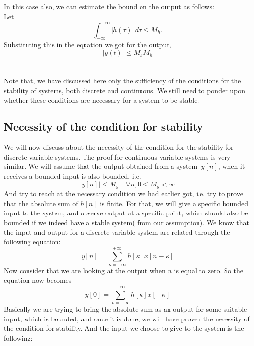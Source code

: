 In this case also, we can estimate the bound on the output as follows:\\
Let
\begin{equation}
\int_{-\infty}^{+\infty}| h(\tau)|\,d\tau \le M_{h}. \nonumber
\end{equation}
Substituting this in the equation we got for the output,
\begin{equation}
|y(t)|\le M_{x}M_{h} \nonumber
\end{equation}\\\\
Note that, we have discussed here only the sufficiency of the conditions for the stability of systems, both discrete and continuous. We still need to ponder upon whether these conditions are necessary for a system to be stable.


\subsection{Necessity of the condition for stability}
We will now discuss about the necessity of the condition for the stability for discrete variable systems. The proof for continuous variable systems is very similar. We will assume that the output obtained from a system, $y[n]$, when it receives a bounded input is also bounded, i.e.
\begin{equation}
|y[n]| \le M_{y} \quad \forall n, 0 \le M_{y}< \infty \nonumber
\end{equation}
And try to reach at the necessary condition we had earlier got, i.e. try to prove that the absolute sum of $h[n]$ is finite. For that, we will give a specific bounded input to the system, and observe output at a specific point, which should also be bounded if we indeed have a stable system( from our assumption). We know that the input and output for a discrete variable system are related through the following equation:
\begin{equation}
y[n]=\sum_{\kappa=-\infty}^{+\infty} h[\kappa]x[n-\kappa] \nonumber
\end{equation}
Now consider that we are looking at the output when $n$ is equal to zero. So the equation now becomes
\begin{equation}
y[0]=\sum_{\kappa=-\infty}^{+\infty} h[\kappa]x[-\kappa] \nonumber
\end{equation}
Basically we are trying to bring the absolute sum as an output for some suitable input, which is bounded, and once it is done, we will have proven the necessity of the condition for stability. And the input we choose to give to the system is the following:
